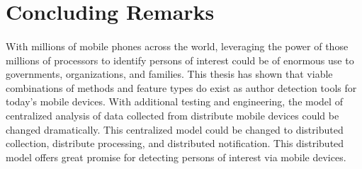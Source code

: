 \section{Concluding Remarks}
\paragraph*{} With millions of mobile phones across the world, leveraging the power of those millions of processors to identify persons of interest could be of enormous use to governments, organizations, and families.  This thesis has shown that viable combinations of methods and feature types do exist as author detection tools for today's mobile devices.  With additional testing and engineering, the model of centralized analysis of data collected from distribute mobile devices could be changed dramatically.  This centralized model could be changed to distributed collection, distribute processing, and distributed notification.  This distributed model offers great promise for detecting persons of interest via mobile devices.

